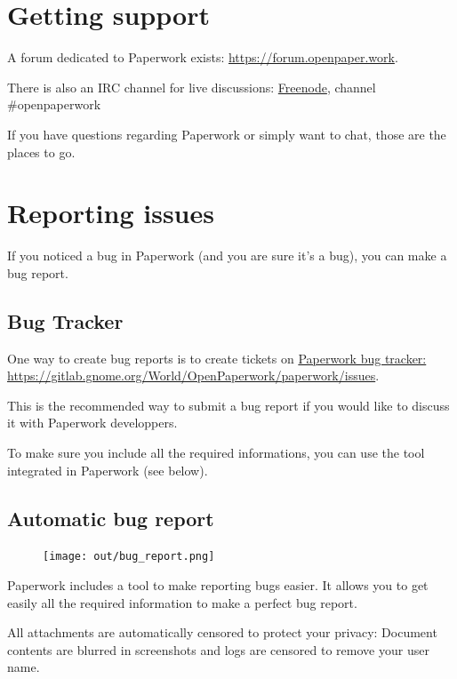 \documentclass[10pt,a4paper]{article}
\begin{document}
\section{Getting support}

A forum dedicated to Paperwork exists:
\href{https://forum.openpaper.work}{https://forum.openpaper.work}.

There is also an IRC channel for live discussions:
\href{https://webchat.freenode.net/}{Freenode}, channel \#openpaperwork

If you have questions regarding Paperwork or simply want to chat, those are
the places to go.

\section{Reporting issues}

If you noticed a bug in Paperwork (and you are sure it's a bug), you can
make a bug report.

\subsection{Bug Tracker}

One way to create bug reports is to create tickets on
\href{https://gitlab.gnome.org/World/OpenPaperwork/paperwork/issues}{Paperwork bug tracker: https://gitlab.gnome.org/World/OpenPaperwork/paperwork/issues}.

This is the recommended way to submit a bug report if you would like to discuss
it with Paperwork developpers.

To make sure you include all the required informations, you can use the
tool integrated in Paperwork (see below).


\subsection{Automatic bug report}

\begin{figure}[H]
	\texttt{[image: out/bug\_report.png]}
\end{figure}

Paperwork includes a tool to make reporting bugs easier. It allows you to get
easily all the required information to make a perfect bug report.

All attachments are automatically censored to protect your privacy: Document
contents are blurred in screenshots and logs are censored to remove your user
name.
\end{document}
